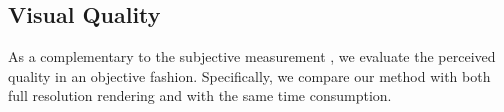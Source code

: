 \subsection{Visual Quality}
As a complementary to the subjective measurement , we evaluate the perceived quality in an objective fashion. Specifically, we compare our method with both full resolution rendering and \cite{mildenhall2020nerf} with the same time consumption.

\begin{figure}[htb]
    \centering
    \begin{minipage}{0.32\linewidth} %
        
        

\end{minipage}
\end{figure}
